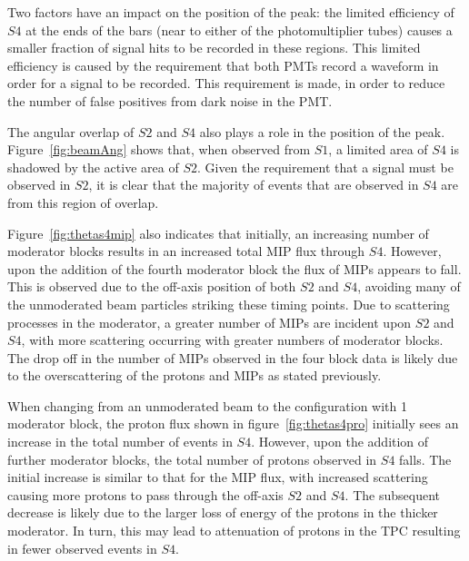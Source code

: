     Two factors have an impact on the position of the peak:
    the limited efficiency of $\mathit{S4}$ at the ends of the bars (near to either of the photomultiplier tubes) causes a smaller fraction of signal hits to be recorded in these regions. 
    This limited efficiency is caused by the requirement that both PMTs record a waveform in order for a signal to be recorded.
    This requirement is made, in order to reduce the number of false positives from dark noise in the PMT.
    
    The angular overlap of $\mathit{S2}$ and $\mathit{S4}$ also plays a role in the position of the peak. 
    Figure~\ref{fig:beamAng} shows that, when observed from $\mathit{S1}$, a limited area of $\mathit{S4}$ is shadowed by the active area of $\mathit{S2}$.
    Given the requirement that a signal must be observed in $\mathit{S2}$, it is clear that the majority of events that are observed in $\mathit{S4}$ are from this region of overlap.
    
    Figure~\ref{fig:thetas4mip} also indicates that initially, an increasing number of moderator blocks results in an increased total MIP flux through $\mathit{S4}$. 
    However, upon the addition of the fourth moderator block the flux of MIPs appears to fall.
    This is observed due to the off-axis position of both $\mathit{S2}$ and $\mathit{S4}$, avoiding many of the unmoderated beam particles striking these timing points.
    Due to scattering processes in the moderator, a greater number of MIPs are incident upon $\mathit{S2}$ and $\mathit{S4}$, with more scattering occurring with greater numbers of moderator blocks.
    The drop off in the number of MIPs observed in the four block data is likely due to the overscattering of the protons and MIPs as stated previously.
    
    When changing from an unmoderated beam to the configuration with 1 moderator block, the proton flux shown in figure~\ref{fig:thetas4pro} initially sees an increase in the total number of events in $\mathit{S4}$.
    However, upon the addition of further moderator blocks, the total number of protons observed in $\mathit{S4}$ falls.
    The initial increase is similar to that for the MIP flux, with increased scattering causing more protons to pass through the off-axis $\mathit{S2}$ and $\mathit{S4}$.
    The subsequent decrease is likely due to the larger loss of energy of the protons in the thicker moderator.
    In turn, this may lead to attenuation of protons in the TPC resulting in fewer observed events in $\mathit{S4}$.
    
